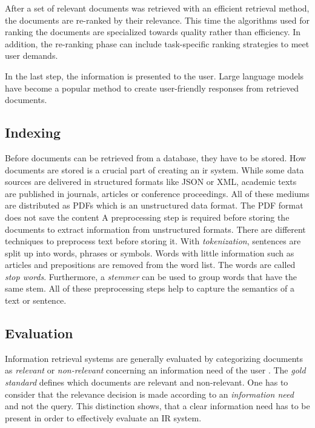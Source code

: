 \documentclass[../main.tex]{subfiles}
\begin{document}
After a set of relevant documents was retrieved with an efficient retrieval method,
the documents are re-ranked by their relevance.
This time the algorithms used for ranking the documents are specialized towards quality rather than efficiency.
In addition, the re-ranking phase can include task-specific ranking strategies to meet user demands.

In the last step, the information is presented to the user.
Large language models have become a popular method to create user-friendly responses from retrieved documents.

\subsection{Indexing}

Before documents can be retrieved from a database,
they have to be stored.
How documents are stored is a crucial part of creating an \gls{ir} system.
While some data sources are delivered in structured formats like JSON or XML,
academic texts are published in journals, articles or conference proceedings.
All of these mediums are distributed as PDFs which is an unstructured data format.
The PDF format does not save the content
A preprocessing step is required before storing the documents to extract information from unstructured formats.
There are different techniques to preprocess text before storing it.
With \emph{tokenization}, sentences are split up into words, phrases or symbols.
Words with little information such as articles and prepositions are removed from the word list.
The words are called \emph{stop words}.
Furthermore, a \emph{stemmer} can be used to group words that have the same stem.
All of these preprocessing steps help to capture the semantics of a text or sentence.


\subsection{Evaluation}

Information retrieval systems are generally evaluated by categorizing documents
as \emph{relevant} or \emph{non-relevant} concerning an information need of the user \cite{Manning2009}.
The \emph{gold standard} defines which documents are relevant and non-relevant.
One has to consider that the relevance decision is made according to an \emph{information need} and not the query.
This distinction shows,
that a clear information need has to be present in order to effectively evaluate an IR system.
\end{document}
